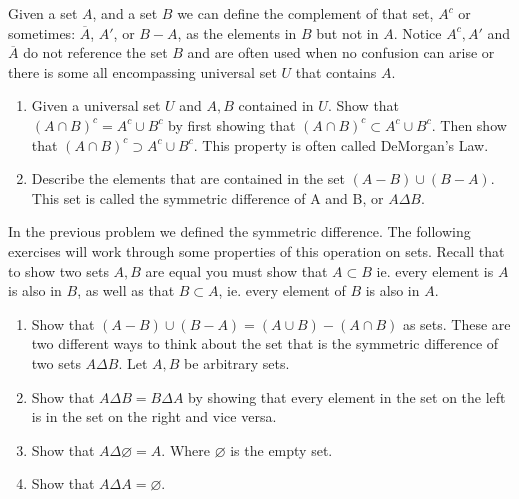 \documentclass{amsbook}
\begin{document}
\begin{Exercise}[title={Complements}, difficulty=0, label = 1b2]
	Given a set $A$, and a set $B$ we can define the complement of that set, $A^c$ or sometimes: $\overline{A}$, $A'$, or $B-A$, as the elements in $B$ but not in $A$.  Notice $A^c, A'$ and $\overline{A}$ do not reference the set $B$ and are often used when no confusion can arise or there is some all encompassing universal set $U$ that contains $A$.
		\begin{enumerate}
			\item Given a universal set $U$ and $A, B$ contained in $U$. Show that $ (A\cap B)^c =A^c \cup B^c$ by first showing that $(A \cap B)^c \subset A^c \cup B^c$. Then show that $(A \cap B)^c \supset A^c \cup B^c$. This property is often called DeMorgan's Law.
			\item Describe the elements that are contained in the set $(A-B) \cup (B-A)$. This set is called the symmetric difference of A and B, or $A \Delta B$.
		\end{enumerate}

\end{Exercise}

\begin{Exercise}[title={Working with Sets}, difficulty=2, label=1b3]

	In the previous problem we defined the symmetric difference. The following exercises will work through some properties of this operation on sets. Recall that to show two sets $A, B$ are equal you must show that $A \subset B$ ie. every element is $A$ is also in $B$, as well as that $B \subset A$, ie. every element of $B$ is also in $A$.
	\begin{enumerate}
		\item Show that $(A-B) \cup (B-A) = (A \cup B) - (A\cap B)$ as sets. These are two different ways to think about the set that is the symmetric difference of two sets $A \Delta B$. Let $A, B$ be arbitrary sets.
		\item Show that $A \Delta B = B \Delta A$ by showing that every element in the set on the left is in the set on the right and vice versa.
		\item Show that $A \Delta \varnothing  = A$. Where $\varnothing$ is the empty set.
		\item Show that $A \Delta A = \varnothing$.
		
		
	\end{enumerate}

\end{Exercise}
\end{document}
